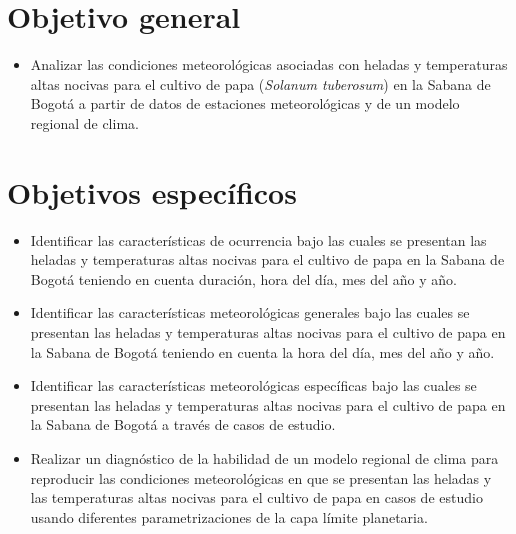 \section{Objetivo general}

\begin{itemize}
    \item Analizar las condiciones meteorológicas asociadas con heladas y temperaturas altas nocivas para el cultivo de papa (\textit{Solanum tuberosum}) en la Sabana de Bogotá a partir de datos de estaciones meteorológicas y de un modelo regional de clima.
    
\end{itemize}

\section{Objetivos específicos}

\begin{itemize}
    \item Identificar las características de ocurrencia bajo las cuales se presentan las heladas y temperaturas altas nocivas para el cultivo de papa en la Sabana de Bogotá teniendo en cuenta duración, hora del día, mes del año y año.
    
    \item Identificar las características meteorológicas generales bajo las cuales se presentan las heladas y temperaturas altas nocivas para el cultivo de papa en la Sabana de Bogotá teniendo en cuenta la hora del día, mes del año y año.
    
    \item Identificar las características meteorológicas específicas bajo las cuales se presentan las heladas y temperaturas altas nocivas para el cultivo de papa en la Sabana de Bogotá a través de casos de estudio.
    
    \item Realizar un diagnóstico de la habilidad de un modelo regional de clima para reproducir las condiciones meteorológicas en que se presentan las heladas y las temperaturas altas nocivas para el cultivo de papa en casos de estudio usando diferentes parametrizaciones de la capa límite planetaria.
\end{itemize}